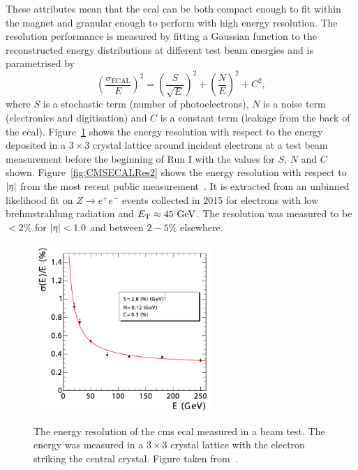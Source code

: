 These attributes mean that the \acrshort{ecal} can be both compact enough to fit within the magnet and granular enough to perform with high energy resolution.
The resolution performance is measured by fitting a Gaussian function to the reconstructed energy distributions at different test beam energies and is parametrised by
\begin{equation}
	\left(\frac{\sigma_{\mathrm{ECAL}}}{E}\right)^{2} = \left(\frac{S}{\sqrt{E}}\right)^{2} + \left(\frac{N}{E}\right)^{2} + C^{2},
\end{equation}
where $S$ is a stochastic term (number of photoelectrons), $N$ is a noise term (electronics and digitisation) and $C$ is a constant term (leakage from the back of the \acrshort{ecal}).
Figure~\ref{fig:CMSECALRes1} shows the energy resolution with respect to the energy deposited in a $3\times3$ crystal lattice around incident electrons at a test beam measurement before the beginning of Run I with the values for $S$, $N$ and $C$ shown. 
Figure~\ref{fig:CMSECALRes2} shows the energy resolution with respect to $\lvert \eta \rvert$ from the most recent public measurement~\cite{CMSECALRESMEAS}.
It is extracted from an unbinned likelihood fit on $Z\rightarrow e^{+}e^{-}$ events collected in 2015 for electrons with low brehmstrahlung radiation and $E_{\mathrm{T}}\approx45\mathrm{~Ge\hspace{-.08em}V}^{}$.
The resolution was measured to be $<2\%$ for $\lvert \eta \rvert<1.0$ and between $2-5\%$ elsewhere.
\begin{figure}[hpb!]
	\centering
	\includegraphics[width=0.6\textwidth]{Figures/CMSECALRES} \\
	\caption[The energy resolution of the \acrshort{cms} \acrshort{ecal} measured in a beam test. The energy was measured in a $3\times3$ crystal lattice with the electron striking the central crystal. ]{The energy resolution of the \acrshort{cms} \acrshort{ecal} measured in a beam test. The energy was measured in a $3\times3$ crystal lattice with the electron striking the central crystal. Figure taken from~\cite{CMSExperiment}.}
	\label{fig:CMSECALRes1}
\end{figure}
